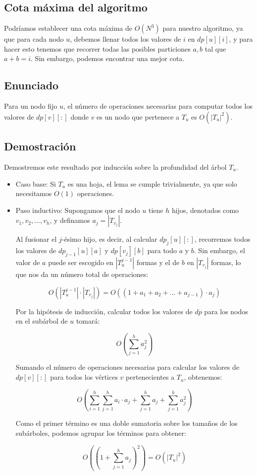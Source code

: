 \subsection{Cota máxima del algoritmo}

Podríamos establecer una cota máxima de $O(N^3)$ para nuestro algoritmo, ya que para cada nodo $u$,
debemos llenar todos los valores de $i$ en $dp[u][i]$, y para hacer esto tenemos que recorrer todas las posibles
particiones $a, b$ tal que $a + b = i$. Sin embargo, podemos encontrar una mejor cota.

\subsection{Enunciado}

Para un nodo fijo $u$, el número de operaciones necesarias para computar todos los valores de 
$dp[v][:]$ donde $v$ es un nodo que pertenece a $T_u$ es $O(|T_u|^2)$.

\subsection{Demostración}

Demostremos este resultado por inducción sobre la profundidad del árbol $T_u$. 

\begin{itemize}
    \item Caso base: Si $T_u$ es una hoja, el lema se cumple trivialmente, ya que solo necesitamos $O(1)$ operaciones.
    \item Paso inductivo: Supongamos que el nodo $u$ tiene $h$ hijos, denotados como $v_1, v_2, \dots, v_h$, y definamos $a_j = |T_{v_j}|$.
    
    Al fusionar el $j$-ésimo hijo, es decir, al calcular $dp_j[u][:]$, recorremos todos los valores de $dp_{j-1}[u][a]$ y 
    $dp[v_j][b]$ para todo $a$ y $b$. Sin embargo, el valor de $a$ puede ser escogido en $|T_u^{j-1}|$ formas y el de $b$ en 
    $|T_{v_j}|$ formas, lo que nos da un número total de operaciones:

    \[
    O(|T_u^{j-1}| \cdot |T_{v_j}|) = O\left( (1 + a_1 + a_2 + \dots + a_{j-1}) \cdot a_j \right)
    \]

    Por la hipótesis de inducción, calcular todos los valores de $dp$ para los nodos en el subárbol de $u$ tomará:

    \[
    O\left( \sum_{j=1}^{h} a_j^2 \right)
    \]

    Sumando el número de operaciones necesarias para calcular los valores de $dp[v][:]$ para todos los vértices $v$ pertenecientes a $T_u$, obtenemos:

    \[
    O\left( \sum_{i=1}^{h} \sum_{j=1}^{h} a_i \cdot a_j + \sum_{j=1}^{h} a_j + \sum_{j=1}^{h} a_j^2 \right)
    \]

    Como el primer término es una doble sumatoria sobre los tamaños de los subárboles, podemos agrupar los términos para obtener:

    \[
    O\left( \left( 1 + \sum_{j=1}^{h} a_j \right)^2 \right) = O(|T_u|^2)
    \]

\end{itemize}


